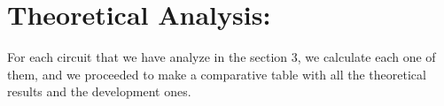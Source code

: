\section{Theoretical Analysis:}

For each circuit that we have analyze in the section 3, we calculate each one of them, and we proceeded to make a comparative table with all the theoretical results and the development ones. \hfill \break

